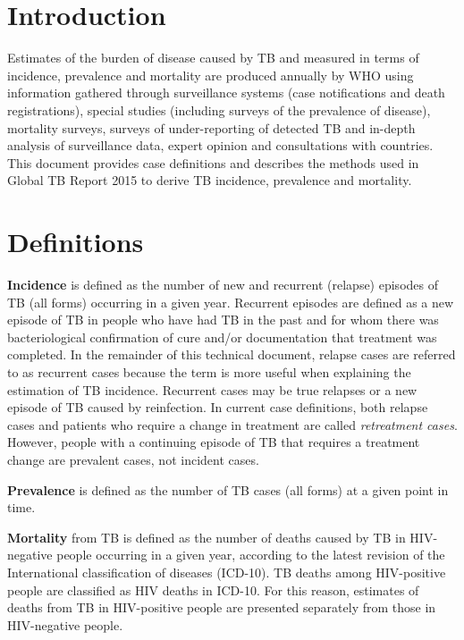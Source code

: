 \begin{multicols}[2]

\section{Introduction}

Estimates of the burden of disease caused by TB and measured in terms of incidence, prevalence and mortality are produced annually by WHO using information gathered through surveillance systems (case notifications and death registrations), special studies (including surveys of the prevalence of disease), mortality surveys, surveys of under-reporting of detected TB and in-depth analysis of surveillance data, expert opinion and consultations with countries. This document provides case definitions and describes the methods used in Global TB Report 2015 to derive TB incidence, prevalence and mortality.

\section{Definitions}
\textbf{Incidence} is defined as the number of new and recurrent (relapse) episodes of TB (all forms) occurring in a given year. Recurrent episodes are defined as a new episode of TB in people who have had TB in the past and for whom there was bacteriological confirmation of cure and/or documentation that treatment was completed. In the remainder of this technical document, relapse cases are referred to as recurrent cases because the term is more useful when explaining the estimation of TB incidence. Recurrent cases may be true relapses or a new episode of TB caused by reinfection. In current case definitions, both relapse cases and patients who require a change in treatment are called \textit{retreatment cases}. However, people with a continuing episode of TB that requires a treatment change are prevalent cases, not incident cases.

\textbf{Prevalence} is defined as the number of TB cases (all forms) at a given point in time. 

\textbf{Mortality} from TB is defined as the number of deaths caused by TB in HIV-negative people occurring in a given year, according to the latest revision of the International classification of diseases (ICD-10). TB deaths among HIV-positive people are classified as HIV deaths in ICD-10. For this reason, estimates of deaths from TB in HIV-positive people are presented separately from those in HIV-negative people.


\end{multicols}
